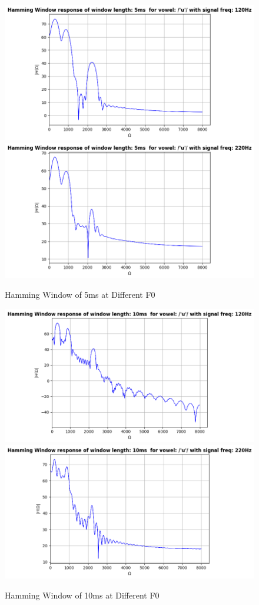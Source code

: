 \documentclass{article}
\begin{document}
\begin{figure}[H]
\centering
\includegraphics[scale = 0.5]{ham_5_120.png}\hfill
\includegraphics[scale = 0.5]{ham_5_220.png}
\caption{Hamming Window of 5ms at Different F0}
\end{figure}

\begin{figure}[H]
\centering
\includegraphics[scale = 0.5]{ham_10_120.png}\hfill
\includegraphics[scale = 0.5]{ham_10_220.png}
\caption{Hamming Window of 10ms at Different F0}
\end{figure}
\newpage
\end{document}
